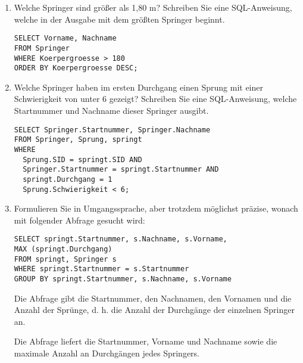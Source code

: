 \documentclass{lehramt-informatik-aufgabe}
\begin{document}
\begin{enumerate}


\item Welche Springer sind größer als 1,80 m? Schreiben Sie eine
SQL-Anweisung, welche in der Ausgabe mit dem größten Springer beginnt.

\begin{antwort}
\begin{verbatim}
SELECT Vorname, Nachname
FROM Springer
WHERE Koerpergroesse > 180
ORDER BY Koerpergroesse DESC;
\end{verbatim}
\end{antwort}


\item Welche Springer haben im ersten Durchgang einen Sprung mit einer
Schwierigkeit von unter 6 gezeigt? Schreiben Sie eine SQL-Anweisung,
welche Startnummer und Nachname dieser Springer ausgibt.

\begin{antwort}
\begin{verbatim}
SELECT Springer.Startnummer, Springer.Nachname
FROM Springer, Sprung, springt
WHERE
  Sprung.SID = springt.SID AND
  Springer.Startnummer = springt.Startnummer AND
  springt.Durchgang = 1
  Sprung.Schwierigkeit < 6;
\end{verbatim}
\end{antwort}


\item Formulieren Sie in Umgangssprache, aber trotzdem möglichst
präzise, wonach mit folgender Abfrage gesucht wird:

\begin{verbatim}
SELECT springt.Startnummer, s.Nachname, s.Vorname,
MAX (springt.Durchgang)
FROM springt, Springer s
WHERE springt.Startnummer = s.Startnummer
GROUP BY springt.Startnummer, s.Nachname, s.Vorname
\end{verbatim}

\begin{antwort}[richtig]
Die Abfrage gibt die Startnummer, den Nachnamen, den Vornamen und
die Anzahl der Sprünge, d. h. die Anzahl der Durchgänge der
einzelnen Springer an.
\end{antwort}

\begin{antwort}
Die Abfrage liefert die Startnummer, Vorname und Nachname sowie die
maximale Anzahl an Durchgängen jedes Springers.
\end{antwort}


\end{enumerate}
\end{document}
